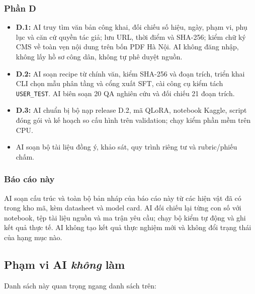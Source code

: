 \subsubsection{Phần D}

\begin{itemize}[leftmargin=2em]
\item \textbf{D.1:} AI truy tìm văn bản công khai, đối chiếu số hiệu, ngày, phạm
vi, phụ lục và căn cứ quyền tác giả; lưu URL, thời điểm và SHA-256; kiểm chữ ký CMS
về toàn vẹn nội dung trên bốn PDF Hà Nội. AI không đăng nhập, không lấy hồ sơ công
dân, không tự phê duyệt nguồn.
\item \textbf{D.2:} AI soạn recipe từ chính văn, kiểm SHA-256 và đoạn trích, triển
khai CLI chọn mẫu phân tầng và cổng xuất SFT, cài công cụ kiểm tách
\texttt{USER\_TEST}. AI biên soạn 20 QA nghiên cứu và đối chiếu 21 đoạn trích.
\item \textbf{D.3:} AI chuẩn bị bộ nạp release D.2, mã QLoRA, notebook Kaggle,
script đóng gói và kế hoạch so cấu hình trên validation; chạy kiểm phần mềm trên
CPU.
\item AI soạn bộ tài liệu đồng ý, khảo sát, quy trình riêng tư và rubric/phiếu
chấm.
\end{itemize}

\subsubsection{Báo cáo này}

AI soạn cấu trúc và toàn bộ bản nháp của báo cáo này từ các hiện vật đã có trong
kho mã, kèm datasheet và model card. AI đối chiếu lại từng con số với notebook, tệp
tài liệu nguồn và ma trận yêu cầu; chạy bộ kiểm tự động và ghi kết quả thực tế. AI
không tạo kết quả thực nghiệm mới và không đổi trạng thái của hạng mục nào.

\subsection{Phạm vi AI \emph{không} làm}

Danh sách này quan trọng ngang danh sách trên:

